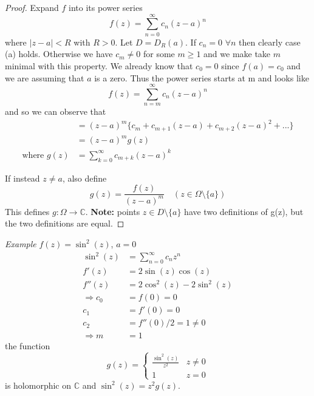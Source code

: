\documentclass[a4paper, 11pt]{article}
\begin{document}
	\begin{proof}
		Expand $f$ into its power series
			\begin{equation*}
				f(z) = \sum\limits_{n=0}^\infty c_n(z-a)^n
			\end{equation*}
		where $|z-a|<R$ with $R>0$. Let $D=D_R(a)$. If $c_n=0$ $\forall n$ then clearly case (a) holds. Otherwise we have $c_m\neq 0$ for some $m\geq 1$ and we make take $m$ minimal with this property. We already know that $c_0=0$ since $f(a)=c_0$ and we are assuming that $a$ is a zero. Thus the power series starts at m and looks like
			\begin{equation*}
				f(z) = \sum\limits_{n=m}^\infty c_n(z-a)^n 
			\end{equation*}
		and so we can observe that
			\begin{align*}
				&= (z-a)^m\Big\{ c_m + c_{m+1}(z-a) + c_{m+2}(z-a)^{2} + ... \Big\} \\
				&= (z-a)^m g(z) \\ 
			\text{where } g(z) &= \sum\limits_{k=0}^\infty c_{m+k}(z-a)^k 
			\end{align*}
		
		\noindent If instead $z\neq a$, also define 
			\begin{equation*}
				g(z) = \frac{f(z)}{(z-a)^m} \quad (z\in\Omega\setminus\{a\})
			\end{equation*}
		This defines $g:\Omega\to\mathbb{C}$. \textbf{Note:} points $z\in D\setminus\{a\}$ have two definitions of g(z), but the two definitions are equal.
	\end{proof}
	
	\noindent\textit{Example} $f(z) = \sin^2(z)$, $a=0$ 
		\begin{align*}
			\sin^2(z) &= \sum\limits_{n=0}^\infty c_n z^n \\ 
			f'(z) &= 2\sin(z)\cos(z) \\ 
			f''(z)&= 2\cos^2(z)-2\sin^2(z) \\ 
			\Rightarrow c_0 &= f(0) = 0 \\ 
				c_1 &= f'(0) = 0 \\ 
				c_2 &= f''(0)/2 = 1 \neq 0 \\ 
			\Rightarrow m&= 1  
		\end{align*}
	\noindent the function
		\begin{equation*}
			g(z) =	\begin{cases}
				\frac{\sin^2(z)}{z^2} & z\neq 0 \\ 
				1 & z=0 
			\end{cases}
		\end{equation*}
	\noindent is holomorphic on $\mathbb{C}$ and $\sin^2(z) = z^2g(z)$. 
	





















	
\end{document}
